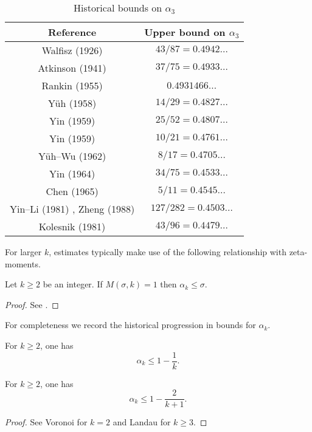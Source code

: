 \begin{table}[ht]
    \def\arraystretch{1.2}
    \centering
    \caption{Historical bounds on $\alpha_3$}
    \begin{tabular}{|c|c|}
    \hline
    Reference & Upper bound on $\alpha_3$\\
    \hline
    Walfisz (1926) \cite{walfisz_uber_1926} & $43/87 = 0.4942\ldots$\\
    \hline
    Atkinson (1941) \cite{atkinson_divisor_1941} & $37/75 = 0.4933\ldots$\\
    \hline
    Rankin (1955) \cite{rankin_van_1955} & $0.4931466\ldots$\\
    \hline
    Y\"{u}h (1958) \cite{yuh_divisor_1958} & $14/29 = 0.4827\ldots$\\
    \hline 
    Yin (1959) \cite{} & $25/52 = 0.4807\ldots$\\
    \hline 
    Yin (1959) \cite{} & $10/21 = 0.4761\ldots$\\
    \hline
    Y\"{u}h--Wu (1962) \cite{yuh_wu_divisor_1962} & $8/17 = 0.4705\ldots$\\
    \hline 
    Yin (1964) \cite{} & $34/75 = 0.4533\ldots$\\
    \hline
    Chen (1965) \cite{chen_divisor_1965} & $5/11 = 0.4545\ldots$\\
    \hline
    Yin--Li (1981) \cite{}, Zheng (1988) \cite{} & $127/282 = 0.4503\ldots$\\
    \hline
    Kolesnik (1981) \cite{kolesnik} & $43/96 = 0.4479\ldots$\\
    \hline
    \end{tabular}
\label{div-alpha3-table}
\end{table}


For larger $k$, estimates typically make use of the following relationship with zeta-moments. 

\begin{lemma}\label{mas}  Let $k \geq 2$ be an integer. If $M(\sigma,k) = 1$ then $\alpha_k \leq \sigma$.
\end{lemma}

\begin{proof}  See \cite[\S 13.3]{ivic}.
\end{proof}

For completeness we record the historical progression in bounds for $\alpha_k$.  
\begin{lemma}\label{piltz-alpha}
For $k \ge 2$, one has
\[
\alpha_k \le 1 - \frac{1}{k}.
\]
\end{lemma}
\begin{lemma}\label{voronoi-alpha}
For $k \ge 2$, one has
\[
\alpha_k \leq 1 - \frac{2}{k + 1}.
\]
\end{lemma}
\begin{proof}
See Voronoi \cite{voronoi_sur_1903} for $k = 2$ and Landau \cite{landau_uber_1912} for $k \ge 3$. 
\end{proof}

